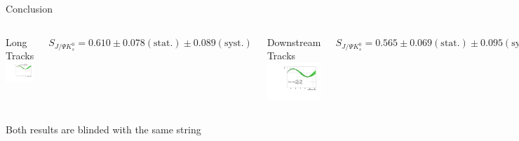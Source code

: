 \documentclass{beamer}
\newcommand{\SJPsi}{S_{J/\Psi K_s^0}}
\begin{document}
\begin{frame}{Conclusion}
	\begin{columns}
	\begin{block}{Long Tracks}
	\centering
	\includegraphics[width=\textwidth]{asymmetry_lt}	
	\end{block}
	$\SJPsi = 0.610 \pm 0.078 (\text{stat.}) \pm 0.089 (\text{syst.})$
	\begin{block}{Downstream Tracks}
	\centering
	\includegraphics[width=\textwidth]{asymmetry_ds}
	\end{block}
	$\SJPsi = 0.565 \pm 0.069 (\text{stat.}) \pm 0.095 (\text{syst.})$
	\end{columns}
    \begin{center}
    Both results are blinded with the same string
    \end{center}
\end{frame}
\end{document}
